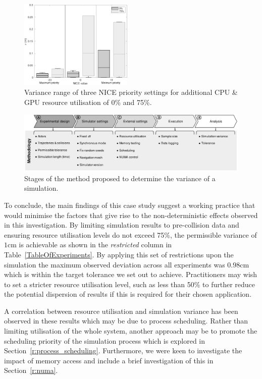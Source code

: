 \begin{figure}[t]
    \centering
    \includegraphics[width=0.48\textwidth]{../other/figures/NICE_analysis_summary_V4.pdf}
    \caption{Variance range of three NICE priority settings for additional CPU \& GPU resource utilisation of 0\% and 75\%.}
    \label{NICEExperimentStressSummary}
\end{figure}

\begin{figure}[t]
    \centering
    \includegraphics[width=0.99\linewidth]{../other/figures/Methodology_Diagram_v8.pdf}
    \caption{Stages of the method proposed to determine the variance of a simulation.}
    \label{method_diagram}
\end{figure}

To conclude, the main findings of this case study suggest a working practice that would minimise the factors that give rise to the non-deterministic effects observed in this investigation. By limiting simulation results to pre-collision data and ensuring resource utilisation levels do not exceed 75\%, the permissible variance of $1$cm is achievable as shown in the \textit{restricted} column in Table~\ref{TableOfExperiments}. By applying this set of restrictions upon the simulation the maximum observed deviation across all experiments was $0.98$cm which is within the target tolerance we set out to achieve. 
%
Practitioners may wish to set a stricter resource utilisation level, such as less than 50\% to further reduce the potential dispersion of results if this is required for their chosen application. 

A correlation between resource utilisation and simulation variance has been observed in these results which may be due to process scheduling. Rather than limiting utilisation of the whole system, another approach may be to promote the scheduling priority of the simulation process which is explored in Section~\ref{r:process_scheduling}. Furthermore, we were keen to investigate the impact of memory access and include a brief investigation of this in Section~\ref{r:numa}. 



